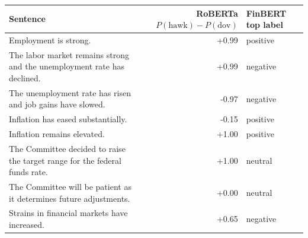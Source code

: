 \begin{tabular}{lrl}
\toprule
Sentence & RoBERTa $P(\mathrm{hawk})-P(\mathrm{dov})$ & FinBERT top label \\
\midrule
Employment is strong. & +0.99 & positive \\
The labor market remains strong and the unemployment rate has declined. & +0.99 & negative \\
The unemployment rate has risen and job gains have slowed. & -0.97 & negative \\
Inflation has eased substantially. & -0.15 & positive \\
Inflation remains elevated. & +1.00 & positive \\
The Committee decided to raise the target range for the federal funds rate. & +1.00 & neutral \\
The Committee will be patient as it determines future adjustments. & +0.00 & neutral \\
Strains in financial markets have increased. & +0.65 & negative \\
\bottomrule
\end{tabular}
